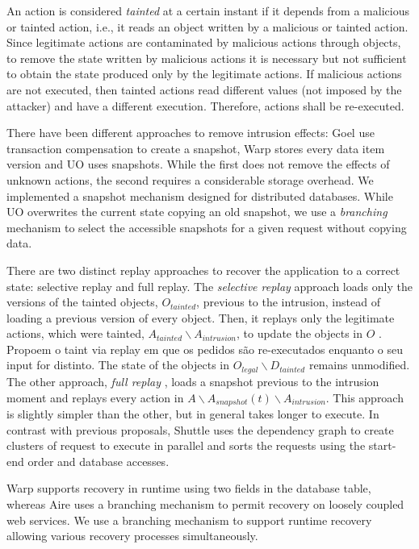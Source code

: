An action is considered \textit{tainted} at a certain instant if it depends from a malicious or tainted action, i.e., it reads an object written by a malicious or tainted action. Since legitimate actions are contaminated by malicious actions through objects, to remove the state written by malicious actions it is necessary but not sufficient to obtain the state produced only by the legitimate actions. If malicious actions are not executed, then tainted actions read different values (not imposed by the attacker) and have a different execution. Therefore, actions shall be re-executed.

There have been different approaches to remove intrusion effects: Goel use transaction compensation to create a snapshot, Warp stores every data item version and UO uses snapshots. While the first does not remove the effects of unknown actions, the second requires a considerable storage overhead. We implemented a snapshot mechanism designed for distributed databases. While UO overwrites the current state copying an old snapshot, we use a \textit{branching} mechanism to select the accessible snapshots for a given request without copying data.

There are two distinct replay approaches to recover the application to a correct state: selective replay and full replay. The \textit{selective replay} approach loads only the versions of the tainted objects, $O_{tainted}$, previous to the intrusion, instead of loading a previous version of every object. Then, it replays only the legitimate actions, which were tainted, $A_{tainted} \backslash A_{intrusion}$, to update the objects in $O$ \cite{para taint via replay}. Propoem o taint via replay em que os pedidos são re-executados enquanto o seu input for distinto. The state of the objects in $O_{legal} \backslash D_{tainted}$ remains unmodified. 
The other approach, \textit{full replay} \cite{undoForOperators}, loads a snapshot previous to the intrusion moment and replays every action in $A \backslash A_{snapshot}(t) \backslash A_{intrusion}$. This approach is slightly simpler than the other, but in general takes longer to execute. In contrast with previous proposals, Shuttle uses the dependency graph to create clusters of request to execute in parallel and sorts the requests using the start-end order and database accesses.

Warp supports recovery in runtime using two fields in the database table, whereas Aire uses a branching mechanism to permit recovery on loosely coupled web services. We use a branching mechanism to support runtime recovery allowing various recovery processes simultaneously. 

